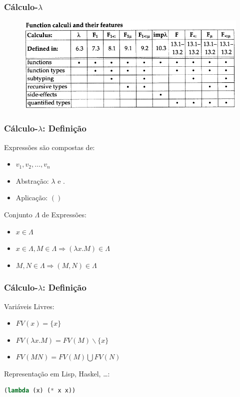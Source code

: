 \documentclass[10pt, compress]{beamer}
\begin{document}
\begin{frame}[fragile]
  \frametitle{Cálculo-$\lambda$}
  \begin{figure}[H]
      \centering
      \includegraphics[width=1\textwidth]{functioncalculi.png}
  \end{figure}
\end{frame}

\begin{frame}[fragile]
  \frametitle{Cálculo-$\lambda$: Definição}
  \begin{block}{Expressões são compostas de:}
      \begin{itemize}
          \item $v_1, v_2, \ldots, v_n$
          \item Abstração: $\lambda$ e $.$
          \item Aplicação: $()$
      \end{itemize}
  \end{block}
  \pause
  \begin{block}{Conjunto $\Lambda$ de Expressões:}
      \begin{itemize}
          \item $x \in \Lambda$
          \item $x \in \Lambda, M \in \Lambda \Rightarrow ({\lambda}x.M) \in \Lambda$
          \item $M, N \in \Lambda \Rightarrow (M,N) \in \Lambda$
      \end{itemize}
  \end{block}
\end{frame}

\begin{frame}[fragile]
  \frametitle{Cálculo-$\lambda$: Definição}
  \begin{block}{Variáveis Livres:}
      \begin{itemize}
          \item $FV(x) = \{x\}$
          \item $FV({\lambda}x.M) = FV(M) \backslash \{x\}$
          \item $FV(M N) = FV(M) \bigcup FV(N)$
      \end{itemize}
  \end{block}
  \pause
  \begin{block}{Representação em Lisp, Haskel, \ldots:}
      \begin{lstlisting}[language=Python, basicstyle=\ttfamily,keywordstyle=\color{red}]
          (lambda (x) (* x x))
      \end{lstlisting}
  \end{block}
\end{frame}
\end{document}

